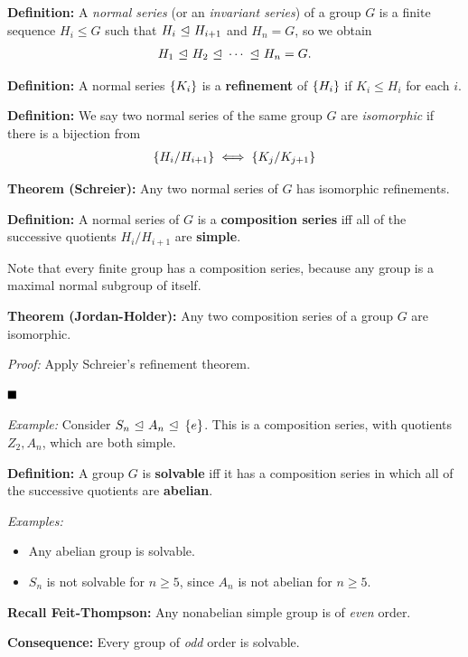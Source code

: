\textbf{Definition:} A \emph{normal series} (or an \emph{invariant
series}) of a group \(G\) is a finite sequence \(H_i \leq G\) such that
\(H_i {~\trianglelefteq~} H_{i+1}\) and \(H_n = G\), so we obtain
\begin{align*}
H_1 {~\trianglelefteq~} H_2 {~\trianglelefteq~} \cdots {~\trianglelefteq~} H_n = G
.\end{align*}

\textbf{Definition:} A normal series \(\left\{{K_i}\right\}\) is a
\textbf{refinement} of \(\left\{{H_i}\right\}\) if \(K_i \leq H_i\) for each
\(i\).

\textbf{Definition:} We say two normal series of the same group \(G\)
are \emph{isomorphic} if there is a bijection from
\begin{align*}
\left\{{H_i / H_{i+1}}\right\} \iff \left\{{K_j / K_{j+1}}\right\}
\end{align*}

\textbf{Theorem (Schreier):} Any two normal series of \(G\) has
isomorphic refinements.

\textbf{Definition:} A normal series of \(G\) is a \textbf{composition
series} iff all of the successive quotients \(H_i / H_{i+1}\) are
\textbf{simple}.

Note that every finite group has a composition series, because any group
is a maximal normal subgroup of itself.

\textbf{Theorem (Jordan-Holder):} Any two composition series of a group
\(G\) are isomorphic.

\emph{Proof:} Apply Schreier's refinement theorem.

\(\qed\)

\emph{Example:} Consider \(S_n {~\trianglelefteq~} A_n {~\trianglelefteq~} \left\{{e}\right\}\). This is
a composition series, with quotients \(Z_2, A_n\), which are both
simple.

\textbf{Definition:} A group \(G\) is \textbf{solvable} iff it has a
composition series in which all of the successive quotients are
\textbf{abelian}.

\emph{Examples:}

\begin{itemize}
\item
  Any abelian group is solvable.
\item
  \(S_n\) is not solvable for \(n\geq 5\), since \(A_n\) is not abelian
  for \(n\geq 5\).
\end{itemize}

\textbf{Recall Feit-Thompson:} Any nonabelian simple group is of
\emph{even} order.

\textbf{Consequence:} Every group of \emph{odd} order is solvable.

